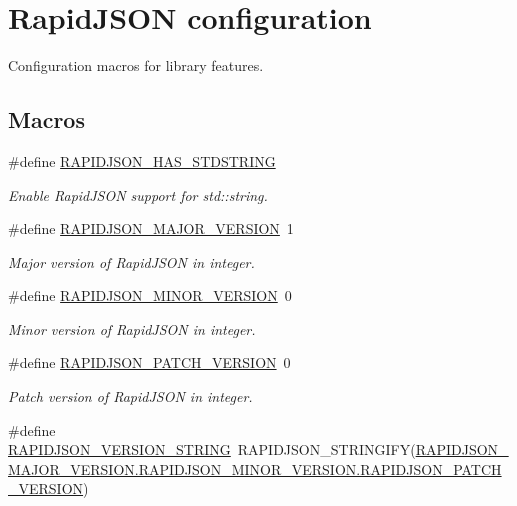 \hypertarget{group__RAPIDJSON__CONFIG}{}\section{Rapid\+J\+S\+ON configuration}
\label{group__RAPIDJSON__CONFIG}


Configuration macros for library features.  


\subsection*{Macros}
\begin{DoxyCompactItemize}
\item 
\#define \hyperlink{group__RAPIDJSON__CONFIG_ga2f2eef0ee4477f3fe5874703a66e997f}{R\+A\+P\+I\+D\+J\+S\+O\+N\+\_\+\+H\+A\+S\+\_\+\+S\+T\+D\+S\+T\+R\+I\+NG}
\begin{DoxyCompactList}\small\item\em Enable Rapid\+J\+S\+ON support for {\ttfamily std\+::string}. \end{DoxyCompactList}\item 
\#define \hyperlink{group__RAPIDJSON__CONFIG_gaf1ff1685be6cbebb5d4b2ab997776f45}{R\+A\+P\+I\+D\+J\+S\+O\+N\+\_\+\+M\+A\+J\+O\+R\+\_\+\+V\+E\+R\+S\+I\+ON}~1
\begin{DoxyCompactList}\small\item\em Major version of Rapid\+J\+S\+ON in integer. \end{DoxyCompactList}\item 
\#define \hyperlink{group__RAPIDJSON__CONFIG_gaf9125105c593a636a79f1c2d96835376}{R\+A\+P\+I\+D\+J\+S\+O\+N\+\_\+\+M\+I\+N\+O\+R\+\_\+\+V\+E\+R\+S\+I\+ON}~0
\begin{DoxyCompactList}\small\item\em Minor version of Rapid\+J\+S\+ON in integer. \end{DoxyCompactList}\item 
\#define \hyperlink{group__RAPIDJSON__CONFIG_gaf967d31be43666ce7f53756d73bd1cdf}{R\+A\+P\+I\+D\+J\+S\+O\+N\+\_\+\+P\+A\+T\+C\+H\+\_\+\+V\+E\+R\+S\+I\+ON}~0
\begin{DoxyCompactList}\small\item\em Patch version of Rapid\+J\+S\+ON in integer. \end{DoxyCompactList}\item 
\#define \hyperlink{group__RAPIDJSON__CONFIG_gad283cfde97d9a32b7d8e8107b11f70a6}{R\+A\+P\+I\+D\+J\+S\+O\+N\+\_\+\+V\+E\+R\+S\+I\+O\+N\+\_\+\+S\+T\+R\+I\+NG}~R\+A\+P\+I\+D\+J\+S\+O\+N\+\_\+\+S\+T\+R\+I\+N\+G\+I\+FY(\hyperlink{group__RAPIDJSON__CONFIG_gaf967d31be43666ce7f53756d73bd1cdf}{R\+A\+P\+I\+D\+J\+S\+O\+N\+\_\+\+M\+A\+J\+O\+R\+\_\+\+V\+E\+R\+S\+I\+O\+N.\+R\+A\+P\+I\+D\+J\+S\+O\+N\+\_\+\+M\+I\+N\+O\+R\+\_\+\+V\+E\+R\+S\+I\+O\+N.\+R\+A\+P\+I\+D\+J\+S\+O\+N\+\_\+\+P\+A\+T\+C\+H\+\_\+\+V\+E\+R\+S\+I\+ON})

\end{DoxyCompactItemize}
